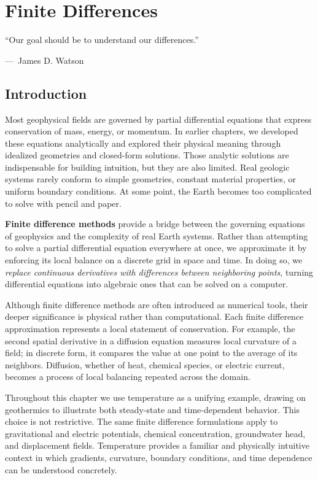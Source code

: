 \chapter{Finite Differences} \label{ch:finitediff}

\epigraph{``Our goal should be to understand our differences.''}
{{\normalfont ---\ James D. Watson}}

\section{Introduction}
Most geophysical fields are governed by partial differential equations that express conservation of mass, energy, or momentum. In earlier chapters, we developed these equations analytically and explored their physical meaning through idealized geometries and closed-form solutions. Those analytic solutions are indispensable for building intuition, but they are also limited. Real geologic systems rarely conform to simple geometries, constant material properties, or uniform boundary conditions. At some point, the Earth becomes too complicated to solve with pencil and paper.

\textbf{Finite difference methods} provide a bridge between the governing equations of geophysics and the complexity of real Earth systems. Rather than attempting to solve a partial differential equation everywhere at once, we approximate it by enforcing its local balance on a discrete grid in space and time. In doing so, we \emph{replace continuous derivatives with differences between neighboring points}, turning differential equations into algebraic ones that can be solved on a computer.

Although finite difference methods are often introduced as numerical tools, their deeper significance is physical rather than computational. Each finite difference approximation represents a local statement of conservation. For example, the second spatial derivative in a diffusion equation measures local curvature of a field; in discrete form, it compares the value at one point to the average of its neighbors. Diffusion, whether of heat, chemical species, or electric current, becomes a process of local balancing repeated across the domain.

Throughout this chapter we use temperature as a unifying example, drawing on geothermics to illustrate both steady-state and time-dependent behavior. This choice is not restrictive. The same finite difference formulations apply to gravitational and electric potentials, chemical concentration, groundwater head, and displacement fields. Temperature provides a familiar and physically intuitive context in which gradients, curvature, boundary conditions, and time dependence can be understood concretely.

